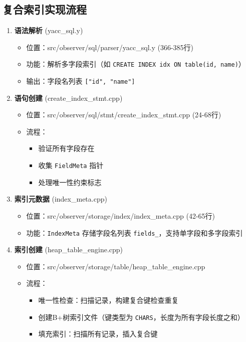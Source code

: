 \documentclass[a4paper, 12pt]{article}
\begin{document}
\subsection{\heiti 复合索引实现流程}
\begin{enumerate}
    \item \textbf{语法解析} (yacc\_sql.y)
    \begin{itemize}
        \item 位置：src/observer/sql/parser/yacc\_sql.y (366-385行)
        \item 功能：解析多字段索引（如 \texttt{CREATE INDEX idx ON table(id, name)}）
        \item 输出：字段名列表 \texttt{["id", "name"]}
    \end{itemize}
    
    \item \textbf{语句创建} (create\_index\_stmt.cpp)
    
\begin{itemize}
        \item 位置：src/observer/sql/stmt/create\_index\_stmt.cpp (24-68行)
        \item 流程：
        \begin{itemize}
            \item 验证所有字段存在
            \item 收集 \texttt{FieldMeta} 指针
            \item 处理唯一性约束标志
        \end{itemize}
    \end{itemize}
    
    \item \textbf{索引元数据} (index\_meta.cpp)
    
\begin{itemize}
        \item 位置：src/observer/storage/index/index\_meta.cpp (42-65行)
        \item 功能：\texttt{IndexMeta} 存储字段名列表 \texttt{fields\_}，支持单字段和多字段索引
    \end{itemize}
    
    \item \textbf{索引创建} (heap\_table\_engine.cpp)
    
\begin{itemize}
        \item 位置：src/observer/storage/table/heap\_table\_engine.cpp
        \item 流程：
        \begin{itemize}
            \item 唯一性检查：扫描记录，构建复合键检查重复
            \item 创建B+树索引文件（键类型为 \texttt{CHARS}，长度为所有字段长度之和）
            \item 填充索引：扫描所有记录，插入复合键
        \end{itemize}
    \end{itemize}


\end{enumerate}
\end{document}
